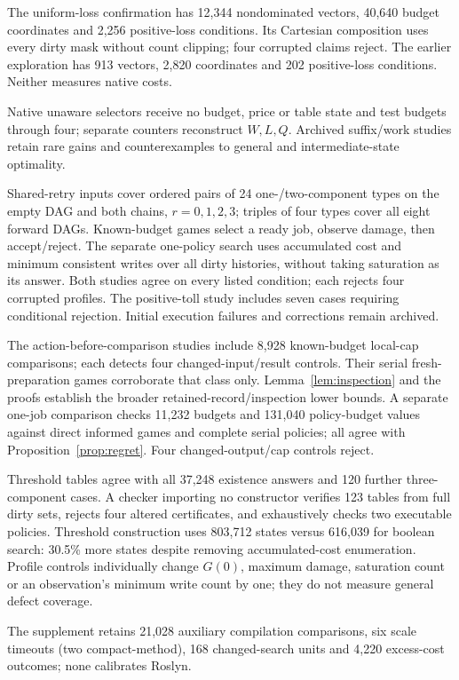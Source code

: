 The uniform-loss confirmation has 12,344 nondominated vectors, 40,640 budget coordinates and 2,256 positive-loss conditions. Its Cartesian composition uses every dirty mask without count clipping; four corrupted claims reject. The earlier exploration has 913 vectors, 2,820 coordinates and 202 positive-loss conditions. Neither measures native costs.

Native unaware selectors receive no budget, price or table state and test budgets through four; separate counters reconstruct $W,L,Q$. Archived suffix/work studies retain rare gains and counterexamples to general and intermediate-state optimality.

Shared-retry inputs cover ordered pairs of 24 one-/two-component types on the empty DAG and both chains, $r=0,1,2,3$; triples of four types cover all eight forward DAGs. Known-budget games select a ready job, observe damage, then accept/reject. The separate one-policy search uses accumulated cost and minimum consistent writes over all dirty histories, without taking saturation as its answer. Both studies agree on every listed condition; each rejects four corrupted profiles. The positive-toll study includes seven cases requiring conditional rejection. Initial execution failures and corrections remain archived.

The action-before-comparison studies include 8,928 known-budget local-cap comparisons; each detects four changed-input/result controls. Their serial fresh-preparation games corroborate that class only. Lemma~\ref{lem:inspection} and the proofs establish the broader retained-record/inspection lower bounds. A separate one-job comparison checks 11,232 budgets and 131,040 policy-budget values against direct informed games and complete serial policies; all agree with Proposition~\ref{prop:regret}. Four changed-output/cap controls reject.

Threshold tables agree with all 37,248 existence answers and 120 further three-component cases. A checker importing no constructor verifies 123 tables from full dirty sets, rejects four altered certificates, and exhaustively checks two executable policies. Threshold construction uses 803,712 states versus 616,039 for boolean search: 30.5\% more states despite removing accumulated-cost enumeration. Profile controls individually change $G(0)$, maximum damage, saturation count or an observation's minimum write count by one; they do not measure general defect coverage.

The supplement retains 21,028 auxiliary compilation comparisons, six scale timeouts (two compact-method), 168 changed-search units and 4,220 excess-cost outcomes; none calibrates Roslyn.

